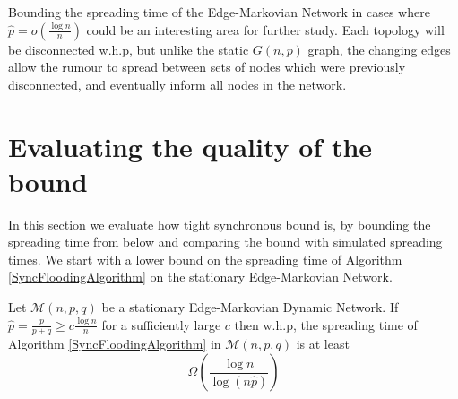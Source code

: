 Bounding the spreading time of the Edge-Markovian Network in cases where $\hat{p} = o(\frac{\log n}{n})$ could be an interesting area for further study. Each topology will be disconnected w.h.p, but unlike the static $G(n,p)$ graph, the changing edges allow the rumour to spread between sets of nodes which were previously disconnected, and eventually inform all nodes in the network.

\section{Evaluating the quality of the bound}\label{section:edgeMarkovianFloodingBoundEvaluation}


In this section we evaluate how tight synchronous bound is, by bounding the spreading time from below and comparing the bound with simulated spreading times.
We start with a lower bound on the spreading time of Algorithm \ref{SyncFloodingAlgorithm} on the stationary Edge-Markovian Network.

\begin{theorem}\label{theorem:edgeMarkovianLowerBound}
	Let $\mathcal{M}(n, p, q)$ be a stationary Edge-Markovian Dynamic Network. If $\hat{p} = \frac{p}{p+q} \geq c \frac{\log n}{n}$ for a sufficiently large $c$ then w.h.p, the spreading time of Algorithm \ref{SyncFloodingAlgorithm} in $\mathcal{M}(n, p, q)$ is at least 
	$$
		\Omega\left(\frac{\log n}{\log (n \hat{p})}\right)
	$$
\end{theorem}

